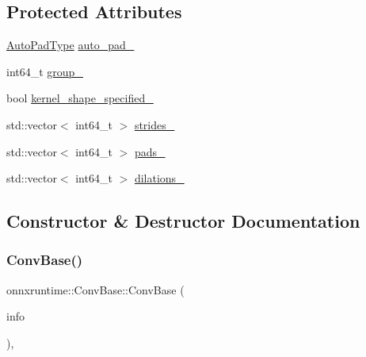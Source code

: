 \subsection*{Protected Attributes}
\begin{DoxyCompactItemize}
\item 
\mbox{\hyperlink{namespaceonnxruntime_add1059a27d156d4ed3567a3a6852d94f}{Auto\+Pad\+Type}} \mbox{\hyperlink{classonnxruntime_1_1ConvBase_a8fc7967659cab901602822bd6a008c7f}{auto\+\_\+pad\+\_\+}}
\item 
int64\+\_\+t \mbox{\hyperlink{classonnxruntime_1_1ConvBase_adc7040aae00906ea72fc285446afea59}{group\+\_\+}}
\item 
bool \mbox{\hyperlink{classonnxruntime_1_1ConvBase_a977ea0ff754348337686c30a3e3476de}{kernel\+\_\+shape\+\_\+specified\+\_\+}}
\item 
std\+::vector$<$ int64\+\_\+t $>$ \mbox{\hyperlink{classonnxruntime_1_1ConvBase_a4b8c43469d15e0876cbb0658e4bc97d1}{strides\+\_\+}}
\item 
std\+::vector$<$ int64\+\_\+t $>$ \mbox{\hyperlink{classonnxruntime_1_1ConvBase_a32c67beb3cc30024848438317a56199c}{pads\+\_\+}}
\item 
std\+::vector$<$ int64\+\_\+t $>$ \mbox{\hyperlink{classonnxruntime_1_1ConvBase_abf0a7ade410cb557b5acf3e524eecf93}{dilations\+\_\+}}
\end{DoxyCompactItemize}


\subsection{Constructor \& Destructor Documentation}
\mbox{\label{classonnxruntime_1_1ConvBase_a45226b6c1b85908b6d345f978bd5b646}} 
\subsubsection{\texorpdfstring{Conv\+Base()}{ConvBase()}}
{\footnotesize\ttfamily onnxruntime\+::\+Conv\+Base\+::\+Conv\+Base (\begin{DoxyParamCaption}\item[{const \mbox{\hyperlink{classonnxruntime_1_1OpKernelInfo}{Op\+Kernel\+Info}} \&}]{info }\end{DoxyParamCaption})\hspace{0.3cm}{\ttfamily [inline]}, {\ttfamily [protected]}}

